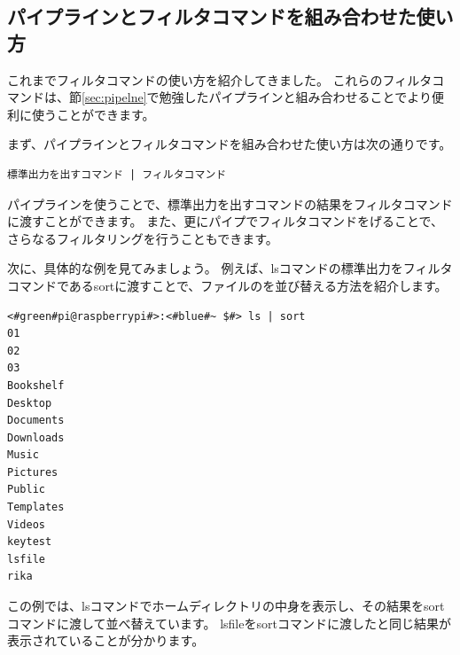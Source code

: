 \subsection{パイプラインとフィルタコマンドを組み合わせた使い方}
これまでフィルタコマンドの使い方を紹介してきました。
これらのフィルタコマンドは、節\ref{sec:pipelne}で勉強したパイプラインと組み合わせることでより便利に使うことができます。

まず、パイプラインとフィルタコマンドを組み合わせた使い方は次の通りです。

\begin{lstlisting}[caption=パイプラインを用いたフィルタコマンドの実行例, label=pipeline_filter]
標準出力を出すコマンド | フィルタコマンド
\end{lstlisting}

パイプラインを使うことで、標準出力を出すコマンドの結果をフィルタコマンドに渡すことができます。
また、更にパイプでフィルタコマンドをげることで、さらなるフィルタリングを行うこともできます。

次に、具体的な例を見てみましょう。
例えば、lsコマンドの標準出力をフィルタコマンドであるsortに渡すことで、ファイルのを並び替える方法を紹介します。

\begin{lstlisting}[caption=パイプラインを用いたsortコマンドの実行例, label=sort_example]
<#green#pi@raspberrypi#>:<#blue#~ $#> ls | sort
01
02
03
Bookshelf
Desktop
Documents
Downloads
Music
Pictures
Public
Templates
Videos
keytest
lsfile
rika
\end{lstlisting}

この例では、lsコマンドでホームディレクトリの中身を表示し、その結果をsortコマンドに渡して並べ替えています。
lsfileをsortコマンドに渡したと同じ結果が表示されていることが分かります。



